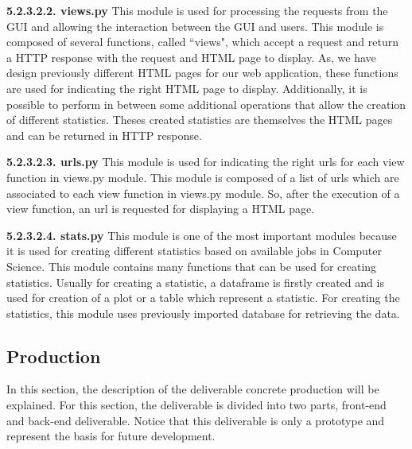 \documentclass[conference,compsoc]{IEEEtran}
\begin{document}
\noindent
\newline\newline
\textbf{5.2.3.2.2. views.py}
\newline\newline
This module is used for processing the requests from the GUI and allowing the interaction between the GUI and users. This module is composed of several functions, called ``views", which accept a request and return a HTTP response with the request and HTML page to display. As, we have design previously different HTML pages for our web application, these functions are used for indicating the right HTML page to display. Additionally, it is possible to perform in between some additional operations that allow the creation of different statistics. Theses created statistics are themselves the HTML pages and can be returned in HTTP response. 

\noindent
\newline\newline
\textbf{5.2.3.2.3. urls.py}
\newline\newline
This module is used for indicating the right urls for each view function in views.py module. This module is composed of a list of urls which are associated to each view function in views.py module. So, after the execution of a view function, an url is requested for displaying a HTML page. 

\noindent
\newline\newline
\textbf{5.2.3.2.4. stats.py}
\newline\newline
This module is one of the most important modules because it is used for creating different statistics based on available jobs in Computer Science. This module contains many functions that can be used for creating statistics. Usually for creating a statistic, a dataframe is firstly created and is used for creation of a plot or a table which represent a statistic. For creating the statistics, this module uses previously imported database for retrieving the data.   

\subsection{Production}
In this section, the description of the deliverable concrete production will be explained. For this section, the deliverable is divided into two parts, front-end and back-end deliverable. Notice that this deliverable is only a prototype and represent the basis for future development.
                                 
\end{document}
